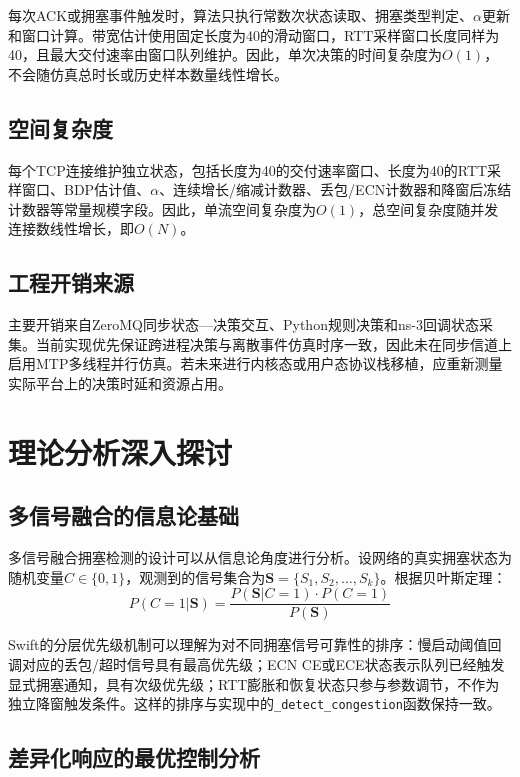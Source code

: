 每次ACK或拥塞事件触发时，算法只执行常数次状态读取、拥塞类型判定、$\alpha$更新和窗口计算。带宽估计使用固定长度为40的滑动窗口，RTT采样窗口长度同样为40，且最大交付速率由窗口队列维护。因此，单次决策的时间复杂度为$O(1)$，不会随仿真总时长或历史样本数量线性增长。

\subsection{空间复杂度}

每个TCP连接维护独立状态，包括长度为40的交付速率窗口、长度为40的RTT采样窗口、BDP估计值、$\alpha$、连续增长/缩减计数器、丢包/ECN计数器和降窗后冻结计数器等常量规模字段。因此，单流空间复杂度为$O(1)$，总空间复杂度随并发连接数线性增长，即$O(N)$。

\subsection{工程开销来源}

主要开销来自ZeroMQ同步状态—决策交互、Python规则决策和ns-3回调状态采集。当前实现优先保证跨进程决策与离散事件仿真时序一致，因此未在同步信道上启用MTP多线程并行仿真。若未来进行内核态或用户态协议栈移植，应重新测量实际平台上的决策时延和资源占用。

\section{理论分析深入探讨}

\subsection{多信号融合的信息论基础}

多信号融合拥塞检测的设计可以从信息论角度进行分析。设网络的真实拥塞状态为随机变量$C \in \{0, 1\}$，观测到的信号集合为$\mathbf{S} = \{S_1, S_2, ..., S_k\}$。根据贝叶斯定理：
\begin{equation}
P(C=1|\mathbf{S}) = \frac{P(\mathbf{S}|C=1) \cdot P(C=1)}{P(\mathbf{S})}
\end{equation}

Swift的分层优先级机制可以理解为对不同拥塞信号可靠性的排序：慢启动阈值回调对应的丢包/超时信号具有最高优先级；ECN CE或ECE状态表示队列已经触发显式拥塞通知，具有次级优先级；RTT膨胀和恢复状态只参与参数调节，不作为独立降窗触发条件。这样的排序与实现中的\texttt{\_detect\_congestion}函数保持一致。

\subsection{差异化响应的最优控制分析}

